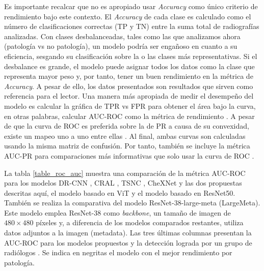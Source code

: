 Es importante recalcar que no es apropiado usar \textit{Accuracy} como único criterio de rendimiento
bajo este contexto. El \textit{Accuracy} de cada clase es calculado como el número de clasificaciones
correctas (TP y TN) entre la suma total de radiografías analizadas. Con clases desbalanceadas, tales
como las que analizamos ahora (patología vs no patología), un modelo podría ser engañoso en cuanto a
su eficiencia, sesgando su clasificación sobre la o las clases más representativas. Si el desbalance
es grande, el modelo puede asignar todos los datos como la clase que representa mayor peso y, por tanto,
tener un buen rendimiento en la métrica de \textit{Accuracy}. A pesar de ello, los datos presentados
son resultados que sirven como referencia para el lector. Una manera más apropiada de medir el desempeño
del modelo es calcular la gráfica de TPR vs FPR para obtener el área bajo la curva, en otras palabras,
calcular AUC-ROC como la métrica de rendimiento \cite{Hanley1983-tu}. A pesar de que la curva de ROC
es preferida sobre la de PR a causa de su convexidad, existe un mapeo uno a uno entre ellas
\cite{10.1145/1143844.1143874}. Al final, ambas curvas son calculadas usando la misma matriz de
confusión. Por tanto, también se incluye la métrica AUC-PR para comparaciones más informativas que
solo usar la curva de ROC \cite{Saito2015-db}.


La tabla \ref{table_roc_auc} muestra una comparación de la métrica AUC-ROC para los modelos DR-CNN
\cite{DBLP:journals/corr/abs-1808-05744}, CRAL \cite{GUAN2020259}, TSNC \cite{CHEN2020221}, CheXNet
\cite{rajpurkar2018deep} y las dos propuestas descritas aquí, el modelo basado en ViT y el modelo basado
en ResNet50. También se realiza la comparativa del modelo ResNet-38-large-meta (LargeMeta). Este modelo
emplea ResNet-38 como \textit{backbone}, un tamaño de imagen de $480 \times 480$ píxeles y, a diferencia
de los modelos comparados restantes, utiliza datos adjuntos a la imagen (metadata). Las tres últimas
columnas presentan la AUC-ROC para los modelos propuestos y la detección lograda por un grupo de radiólogos
\cite{rajpurkar2018deep}. Se indica en negritas el modelo con el mejor rendimiento por patología.

